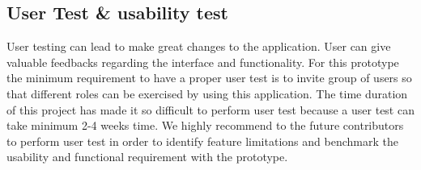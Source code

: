 \subsection{User Test \& usability test} %
\label{sub:user_test}
User testing can lead to make great changes to the application. User can give valuable feedbacks regarding the interface and functionality. For this prototype the minimum requirement to have a proper user test is to invite group of users so that different roles can be exercised by using this application. 
The time duration of this project has made it so difficult to perform user test because a user test can take minimum 2-4 weeks time. We highly recommend to the future contributors to perform user test in order to identify feature limitations and benchmark the usability and functional requirement with the prototype.
